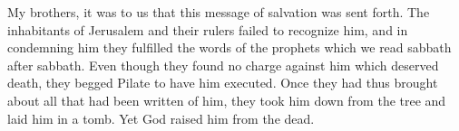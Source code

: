 \lettrine[lines=3]{M}{}y brothers, it was to us that this message of salvation was sent forth. The inhabitants of Jerusalem and their rulers failed to recognize him, and in condemning him they fulfilled the words of the prophets which we read sabbath after sabbath. Even though they found no charge against him which deserved death, they begged Pilate to have him executed. Once they had thus brought about all that had been written of him, they took him down from the tree and laid him in a tomb. Yet God raised him from the dead.
